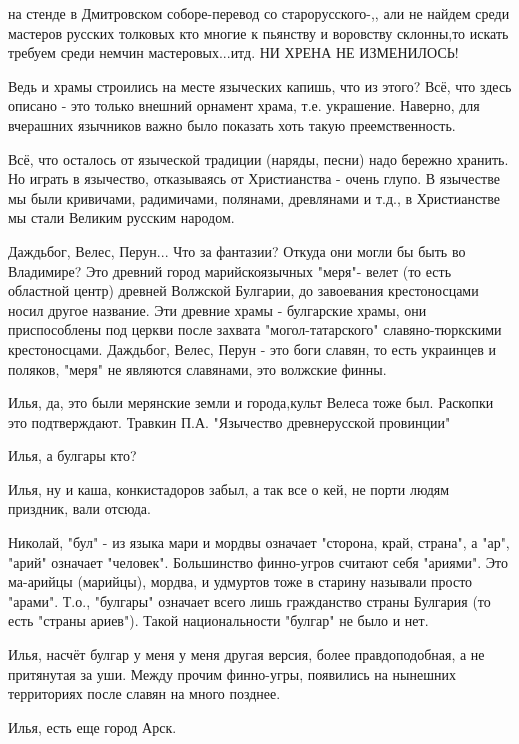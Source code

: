 \begin{itemize}

на стенде в Дмитровском соборе-перевод со старорусского-,, али не найдем среди
мастеров русских толковых кто многие к пьянству и воровству склонны,то искать
требуем среди немчин мастеровых...итд. НИ ХРЕНА НЕ ИЗМЕНИЛОСЬ!


Ведь и храмы строились на месте языческих капишь, что из этого? Всё, что здесь
описано - это только внешний орнамент храма, т.е. украшение. Наверно, для
вчерашних язычников важно было показать хоть такую преемственность.

Всё, что осталось от языческой традиции (наряды, песни) надо бережно хранить.
Но играть в язычество, отказываясь от Христианства - очень глупо. В язычестве
мы были кривичами, радимичами, полянами, древлянами и т.д., в Христианстве мы
стали Великим русским народом.


Даждьбог, Велес, Перун... Что за фантазии? Откуда они могли бы быть во
Владимире? Это древний город марийскоязычных "меря"- велет (то есть областной
центр) древней Волжской Булгарии, до завоевания крестоносцами носил другое
название. Эти древние храмы - булгарские храмы, они приспособлены под церкви
после захвата "могол-татарского" славяно-тюркскими крестоносцами. Даждьбог,
Велес, Перун - это боги славян, то есть украинцев и поляков, "меря" не являются
славянами, это волжские финны.


Илья, да, это были мерянские земли и города,культ Велеса тоже был. Раскопки это
подтверждают. Травкин П.А. "Язычество древнерусской провинции"


Илья, а булгары кто?


Илья, ну и каша, конкистадоров забыл, а так все о кей, не порти людям приздник,
вали отсюда.


Николай, "бул" - из языка мари и мордвы означает "сторона, край, страна", а
"ар", "арий" означает "человек". Большинство финно-угров считают себя "ариями".
Это ма-арийцы (марийцы), мордва, и удмуртов тоже в старину называли просто
"арами". Т.о., "булгары" означает всего лишь гражданство страны Булгария (то
есть "страны ариев"). Такой национальности "булгар" не было и нет.


Илья, насчёт булгар у меня у меня другая версия, более правдоподобная, а не
притянутая за уши. Между прочим финно-угры, появились на нынешних территориях
после славян на много позднее.


Илья, есть еще город Арск.
\end{itemize}
